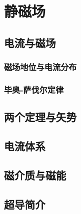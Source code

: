 \chapter{静磁场}


\section{电流与磁场}

\subsection{磁场地位与电流分布}

\subsection{毕奥-萨伐尔定律}


\section{两个定理与矢势}

\section{电流体系}

\section{磁介质与磁能}

\section{超导简介}
